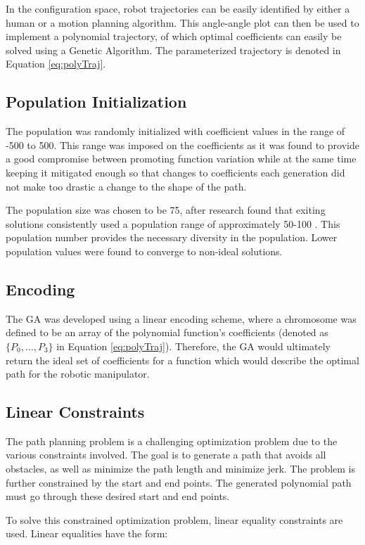 In the configuration space, robot trajectories can be easily identified by either a human or a motion planning algorithm. This angle-angle plot can then be used to implement a polynomial trajectory, of which optimal coefficients can easily be solved using a Genetic Algorithm. The parameterized trajectory is denoted in Equation \ref{eq:polyTraj}.

\subsection{Population Initialization}

The population was randomly initialized with coefficient values in the range of -500 to 500. This range was imposed on the coefficients as it was found to provide a good compromise between promoting function variation while at the same time keeping it mitigated enough so that changes to coefficients each generation did not make too drastic a change to the shape of the path.

The population size was chosen to be 75, after research found that exiting solutions consistently used a population range of approximately 50-100 \cite{gulsen95}. This population number provides the necessary diversity in the population. Lower population values were found to converge to non-ideal solutions. 

\subsection{Encoding}
The GA was developed using a linear encoding scheme, where a chromosome was defined to be an array of the polynomial function's coefficients (denoted as $\{P_0, \ldots, P_3\}$ in Equation \ref{eq:polyTraj}). Therefore, the GA would ultimately return the ideal set of coefficients for a function which would describe the optimal path for the robotic manipulator.

\subsection{Linear Constraints}
The path planning problem is a challenging optimization problem due to the various constraints involved. The goal is to generate a path that avoids all obstacles, as well as minimize the path length and minimize jerk. The problem is further constrained by the start and end points. The generated polynomial path must go through these desired start and end points.

To solve this constrained optimization problem, linear equality constraints are used. Linear equalities have the form:

